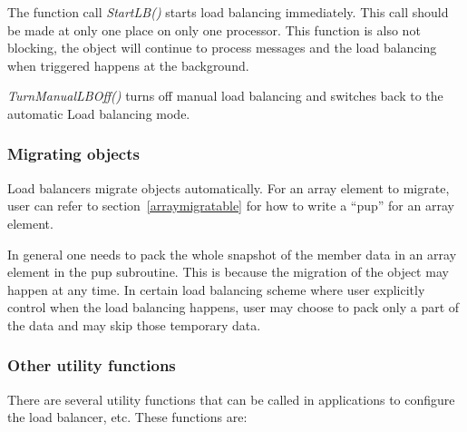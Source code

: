 \begin{enumerate}
The function call {\em StartLB()} starts load balancing immediately. 
This call should be made at only one place on only one processor.
This function is also not blocking, the object will continue to process
messages and the load balancing when triggered
happens at the background.

{\em TurnManualLBOff()} turns off manual load balancing and 
switches back to the automatic Load balancing mode.

\end{enumerate}

\subsubsection{Migrating objects}
\label{lbmigobj}

Load balancers migrate objects automatically.
For an array element to migrate, user can refer to section~\ref{arraymigratable}
for how to write a ``pup'' for an array element.

In general one needs to pack the whole snapshot of the member data in an 
array element in the pup subroutine. This is because the migration of
the object may happen at any time. In certain load balancing scheme where
user explicitly control when the load balancing happens, user may choose
to pack only a part of the data and may skip those temporary data.

\subsubsection{Other utility functions}

There are several utility functions that can be called in applications to
configure the load balancer, etc. These functions are:

